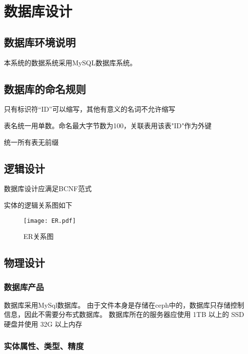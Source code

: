 \chapter{数据库设计}
\section{数据库环境说明}
本系统的数据系统采用MySQL数据库系统。

\section{数据库的命名规则}
只有标识符“ID”可以缩写，其他有意义的名词不允许缩写

表名统一用单数。命名最大字节数为100，关联表用该表"ID"作为外键

统一所有表无前缀

\section{逻辑设计}
数据库设计应满足BCNF范式

实体的逻辑关系图如下
\begin{figure}
    \centering
    \texttt{[image: ER.pdf]}
    \caption{ER关系图}\label{fig:noted-figure}
\end{figure}

\section{物理设计}
\subsection{数据库产品}
数据库采用MySql数据库。
由于文件本身是存储在ceph中的，数据库只存储控制信息，因此不需要分布式数据库。
数据库所在的服务器应使用 1TB 以上的 SSD 硬盘并使用 32G 以上内存

\subsection{实体属性、类型、精度}
